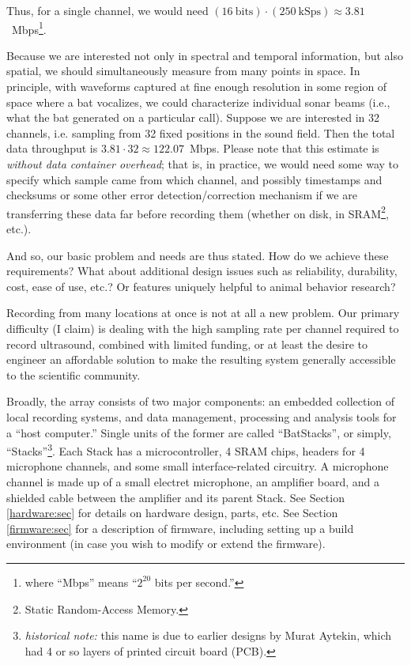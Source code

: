\documentclass[letterpaper]{article}
\begin{document}
Thus, for a single channel, we would need $(16 \mathrm{~bits}) \cdot{}
(250 \mathrm{~kSps}) \approx 3.81$~Mbps\footnote{where ``Mbps'' means
  ``$2^{20}$ bits per second.''}.

Because we are interested not only in spectral and temporal
information, but also spatial, we should simultaneously measure from
many points in space.  In principle, with waveforms captured at fine
enough resolution in some region of space where a bat vocalizes, we
could characterize individual sonar beams (i.e., what the bat
generated on a particular call).  Suppose we are interested in 32
channels, i.e. sampling from 32 fixed positions in the sound field.
Then the total data throughput is $3.81 \cdot{} 32 \approx
122.07$~Mbps.  Please note that this estimate is \textit{without data
  container overhead}; that is, in practice, we would need some way to
specify which sample came from which channel, and possibly timestamps
and checksums or some other error detection/correction mechanism if we
are transferring these data far before recording them (whether on
disk, in SRAM\footnote{Static Random-Access Memory.}, etc.).

And so, our basic problem and needs are thus stated.  How do we
achieve these requirements?  What about additional design issues such
as reliability, durability, cost, ease of use, etc.?  Or features
uniquely helpful to animal behavior research?

Recording from many locations at once is not at all a new problem.
Our primary difficulty (I claim) is dealing with the high sampling
rate per channel required to record ultrasound, combined with limited
funding, or at least the desire to engineer an affordable solution to
make the resulting system generally accessible to the scientific
community.

Broadly, the array consists of two major components: an embedded
collection of local recording systems, and data management, processing
and analysis tools for a ``host computer.'' Single units of the former
are called ``BatStacks'', or simply, ``Stacks''\footnote{\textit{historical
  note:} this name is due to earlier designs by Murat Aytekin, which
had 4 or so layers of printed circuit board (PCB).}. Each Stack has a
microcontroller, 4 SRAM chips, headers for 4 microphone channels, and
some small interface-related circuitry. A microphone channel is made
up of a small electret microphone, an amplifier board, and a shielded
cable between the amplifier and its parent Stack. See Section
\ref{hardware:sec} for details on hardware design, parts, etc. See
Section \ref{firmware:sec} for a description of firmware, including
setting up a build environment (in case you wish to modify or extend
the firmware).
\end{document}
